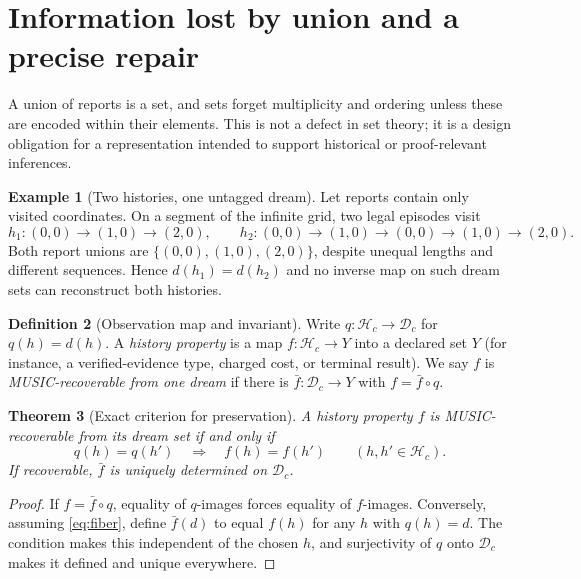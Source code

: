 \documentclass[11pt,letterpaper]{article}
\newtheorem{theorem}{Theorem}[section]
\theoremstyle{definition}
\newtheorem{definition}[theorem]{Definition}
\newtheorem{example}[theorem]{Example}
\theoremstyle{remark}
\newcommand{\Dream}{\mathcal{D}}
\begin{document}
\section{Information lost by union and a precise repair}
A union of reports is a set, and sets forget multiplicity and ordering unless these are encoded within their elements. This is not a defect in set theory; it is a design obligation for a representation intended to support historical or proof-relevant inferences.

\begin{example}[Two histories, one untagged dream]\label{ex:collision}
Let reports contain only visited coordinates. On a segment of the infinite grid, two legal episodes visit
\[
 h_1:(0,0)\to(1,0)\to(2,0),
 \qquad
 h_2:(0,0)\to(1,0)\to(0,0)\to(1,0)\to(2,0).
\]
Both report unions are $\{(0,0),(1,0),(2,0)\}$, despite unequal lengths and different sequences. Hence $d(h_1)=d(h_2)$ and no inverse map on such dream sets can reconstruct both histories.
\end{example}

\begin{definition}[Observation map and invariant]\label{def:factor}
Write $q:\mathcal H_c\to\Dream_c$ for $q(h)=d(h)$. A \emph{history property} is a map $f:\mathcal H_c\to Y$ into a declared set $Y$ (for instance, a verified-evidence type, charged cost, or terminal result). We say $f$ is \emph{MUSIC-recoverable from one dream} if there is $\bar f:\Dream_c\to Y$ with $f=\bar f\circ q$.
\end{definition}

\begin{theorem}[Exact criterion for preservation]\label{thm:factor}
A history property $f$ is MUSIC-recoverable from its dream set if and only if
\begin{equation}\label{eq:fiber}
q(h)=q(h')\quad\Longrightarrow\quad f(h)=f(h')
\qquad (h,h'\in\mathcal H_c).
\end{equation}
If recoverable, $\bar f$ is uniquely determined on $\Dream_c$.
\end{theorem}
\begin{proof}
If $f=\bar f\circ q$, equality of $q$-images forces equality of $f$-images. Conversely, assuming \eqref{eq:fiber}, define $\bar f(d)$ to equal $f(h)$ for any $h$ with $q(h)=d$. The condition makes this independent of the chosen $h$, and surjectivity of $q$ onto $\Dream_c$ makes it defined and unique everywhere.
\end{proof}
\end{document}
